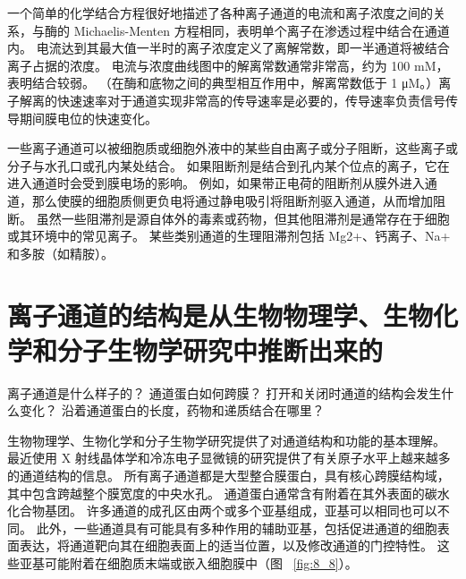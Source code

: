 一个简单的化学结合方程很好地描述了各种离子通道的电流和离子浓度之间的关系，与酶的 Michaelis-Menten 方程相同，表明单个离子在渗透过程中结合在通道内。
电流达到其最大值一半时的离子浓度定义了离解常数，即一半通道将被结合离子占据的浓度。
电流与浓度曲线图中的解离常数通常非常高，约为 100 mM，表明结合较弱。 （在酶和底物之间的典型相互作用中，解离常数低于 1 μM。）离子解离的快速速率对于通道实现非常高的传导速率是必要的，传导速率负责信号传导期间膜电位的快速变化。


一些离子通道可以被细胞质或细胞外液中的某些自由离子或分子阻断，这些离子或分子与水孔口或孔内某处结合。 如果阻断剂是结合到孔内某个位点的离子，它在进入通道时会受到膜电场的影响。
例如，如果带正电荷的阻断剂从膜外进入通道，那么使膜的细胞质侧更负电将通过静电吸引将阻断剂驱入通道，从而增加阻断。
虽然一些阻滞剂是源自体外的毒素或药物，但其他阻滞剂是通常存在于细胞或其环境中的常见离子。
某些类别通道的生理阻滞剂包括 Mg2+、钙离子、Na+ 和多胺（如精胺）。



\section{离子通道的结构是从生物物理学、生物化学和分子生物学研究中推断出来的}

离子通道是什么样子的？
通道蛋白如何跨膜？
打开和关闭时通道的结构会发生什么变化？
沿着通道蛋白的长度，药物和递质结合在哪里？


生物物理学、生物化学和分子生物学研究提供了对通道结构和功能的基本理解。
最近使用 X 射线晶体学和冷冻电子显微镜的研究提供了有关原子水平上越来越多的通道结构的信息。
所有离子通道都是大型整合膜蛋白，具有核心跨膜结构域，其中包含跨越整个膜宽度的中央水孔。
通道蛋白通常含有附着在其外表面的碳水化合物基团。 许多通道的成孔区由两个或多个亚基组成，亚基可以相同也可以不同。
此外，一些通道具有可能具有多种作用的辅助亚基，包括促进通道的细胞表面表达，将通道靶向其在细胞表面上的适当位置，以及修改通道的门控特性。
这些亚基可能附着在细胞质末端或嵌入细胞膜中（图 ~\ref{fig:8_8}）。


